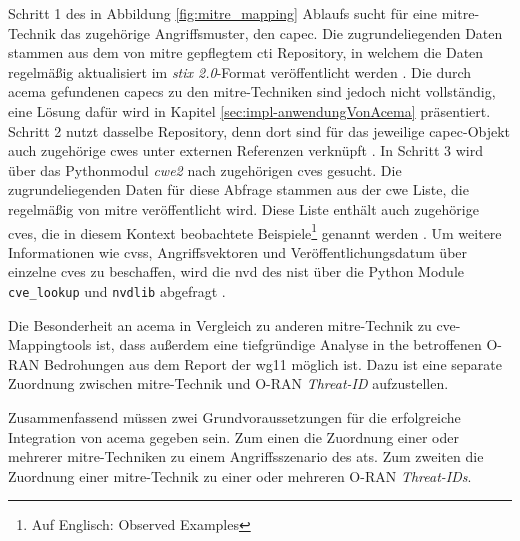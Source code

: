 \par Schritt 1 des in Abbildung \ref{fig:mitre_mapping} Ablaufs sucht für eine \gls{mitre}-Technik das zugehörige Angriffsmuster, den \gls{capec}. Die zugrundeliegenden Daten stammen aus dem von \gls{mitre} gepflegtem \gls{cti} Repository, in welchem die Daten regelmäßig aktualisiert im \textit{\gls{stix} 2.0}-Format veröffentlicht werden \autocite{IntroductionSTIX,MitreCtiCyber}. Die durch \gls{acema} gefundenen \glspl{capec} zu den \gls{mitre}-Techniken sind jedoch nicht vollständig, eine Lösung dafür wird in Kapitel \ref{sec:impl-anwendungVonAcema} präsentiert. Schritt 2 nutzt dasselbe Repository, denn dort sind für das jeweilige \gls{capec}-Objekt auch zugehörige \glspl{cwe} unter externen Referenzen verknüpft \autocite{CtiUSAGEmdMaster}. In Schritt 3 wird über das Pythonmodul \textit{cwe2} nach zugehörigen \glspl{cve} gesucht. Die zugrundeliegenden Daten für diese Abfrage stammen aus der \gls{cwe} Liste, die regelmäßig von \gls{mitre} veröffentlicht wird. Diese Liste enthält auch zugehörige \glspl{cve}, die in diesem Kontext \glqq{}beobachtete Beispiele\grqq{}\footnote{Auf Englisch: \glqq{}Observed Examples\grqq} genannt werden \autocite{AboutcodeorgCwe22024,CWEDownloads}. Um weitere Informationen wie \gls{cvss}, Angriffsvektoren und Veröffentlichungsdatum über einzelne \glspl{cve} zu beschaffen, wird die \gls{nvd} des \gls{nist} über die Python Module \verb|cve_lookup| und \verb|nvdlib| abgefragt \autocite{NVDLibNVDLibNIST,MachineThingCve_lookupLook,NVDHome}.
\par Die Besonderheit an \gls{acema} in Vergleich zu anderen \gls{mitre}-Technik zu \gls{cve}-Mappingtools ist, dass außerdem eine tiefgründige Analyse in the betroffenen O-RAN Bedrohungen aus dem Report der \gls{wg11} möglich ist. Dazu ist eine separate Zuordnung zwischen \gls{mitre}-Technik und O-RAN \textit{Threat-ID} aufzustellen.
\par Zusammenfassend müssen zwei Grundvoraussetzungen für die erfolgreiche Integration von \gls{acema} gegeben sein. Zum einen die Zuordnung einer oder mehrerer \gls{mitre}-Techniken zu einem Angriffsszenario des \gls{at}s. Zum zweiten die Zuordnung einer \gls{mitre}-Technik zu einer oder mehreren O-RAN \textit{Threat-IDs}.

